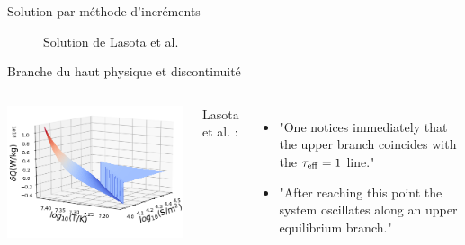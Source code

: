 \documentclass{beamer}
\begin{document}
\begin{frame}{Solution par méthode d'incréments}
\begin{figure}[ht]
\begin{minipage}[ht]{0.4\linewidth}
        \caption{Solution de Lasota et al.}
      \end{minipage}
    \end{figure}
\end{frame}

\begin{frame}{Branche du haut physique et discontinuité}
  \begin{columns}
      \includegraphics[width=\textwidth]{3D_discontinuity_magnified.png}

      Lasota et al. :
      \begin{itemize}
        \item "One notices immediately that the upper branch coincides with the $\tau_{\rm{eff}} = 1$ line."
        \item "After reaching this point the system oscillates along an upper equilibrium branch."
      \end{itemize}
  \end{columns}
\end{frame}
\end{document}
